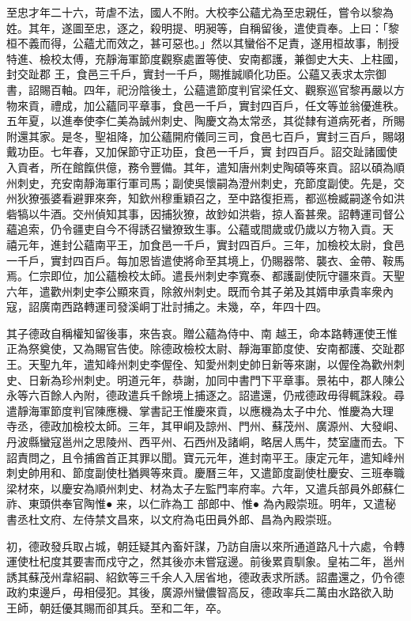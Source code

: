 \begin{pinyinscope}
 至忠才年二十六，苛虐不法，國人不附。大校李公蘊尤為至忠親任，嘗令以黎為姓。其年，遂圖至忠，逐之，殺明提、明昶等，自稱留後，遣使貢奉。上曰：「黎桓不義而得，公蘊尤而效之，甚可惡也。」然以其蠻俗不足責，遂用桓故事，制授特進、檢校太傅，充靜海軍節度觀察處置等使、安南都護，兼御史大夫、上柱國，封交趾郡
 王，食邑三千戶，實封一千戶，賜推誠順化功臣。公蘊又表求太宗御書，詔賜百軸。四年，祀汾陰後土，公蘊遣節度判官梁任文、觀察巡官黎再嚴以方物來貢，禮成，加公蘊同平章事，食邑一千戶，實封四百戶，任文等並翁優進秩。五年夏，以進奉使李仁美為誠州刺史、陶慶文為太常丞，其從隸有道病死者，所賜附還其家。是冬，聖祖降，加公蘊開府儀同三司，食邑七百戶，實封三百戶，賜翊戴功臣。七年春，又加保節守正功臣，食邑一千戶，實
 封四百戶。詔交趾諸國使入貢者，所在館餼供億，務令豐備。其年，遣知唐州刺史陶碩等來貢。詔以碩為順州刺史，充安南靜海軍行軍司馬；副使吳懷嗣為澄州刺史，充節度副使。先是，交州狄獠張婆看避罪來奔，知欽州穆重穎召之，至中路復拒焉，都巡檢臧嗣遂令如洪砦犒以牛酒。交州偵知其事，因捕狄獠，故鈔如洪砦，掠人畜甚衆。詔轉運司督公蘊追索，仍令疆吏自今不得誘召蠻獠致生事。公蘊或間歲或仍歲以方物入貢。天
 禧元年，進封公蘊南平王，加食邑一千戶，實封四百戶。三年，加檢校太尉，食邑一千戶，實封四百戶。每加恩皆遣使將命至其境上，仍賜器幣、襲衣、金帶、鞍馬焉。仁宗即位，加公蘊檢校太師。遣長州刺史李寬泰、都護副使阮守疆來貢。天聖六年，遣歡州刺史李公顯來貢，除敘州刺史。既而令其子弟及其婿申承貴率衆內寇，詔廣南西路轉運司發溪峒丁壯討捕之。未幾，卒，年四十四。


其子德政自稱權知留後事，來告哀。贈公蘊為侍中、南
 越王，命本路轉運使王惟正為祭奠使，又為賜官告使。除德政檢校太尉、靜海軍節度使、安南都護、交趾郡王。天聖九年，遣知峰州刺史李偓佺、知愛州刺史帥日新等來謝，以偓佺為歡州刺史、日新為珍州刺史。明道元年，恭謝，加同中書門下平章事。景祐中，郡人陳公永等六百餘人內附，德政遣兵千餘境上捕逐之。詔遣還，仍戒德政毋得輒誅殺。尋遣靜海軍節度判官陳應機、掌書記王惟慶來貢，以應機為太子中允、惟慶為大理
 寺丞，德政加檢校太師。三年，其甲峒及諒州、門州、蘇茂州、廣源州、大發峒、丹波縣蠻寇邕州之思陵州、西平州、石西州及諸峒，略居人馬牛，焚室廬而去。下詔責問之，且令捕酋首正其罪以聞。寶元元年，進封南平王。康定元年，遣知峰州刺史帥用和、節度副使杜猶興等來貢。慶曆三年，又遣節度副使杜慶安、三班奉職梁材來，以慶安為順州刺史、材為太子左監門率府率。六年，又遣兵部員外郎蘇仁祚、東頭供奉官陶惟●
 来，以仁祚為工
 部郎中、惟●
 為內殿崇班。明年，又遣秘書丞杜文府、左侍禁文昌來，以文府為屯田員外郎、昌為內殿崇班。



 初，德政發兵取占城，朝廷疑其內畜奸謀，乃訪自唐以來所通道路凡十六處，令轉運使杜杞度其要害而戍守之，然其後亦未嘗寇邊。前後累貢馴象。皇祐二年，邕州誘其蘇茂州韋紹嗣、紹欽等三千余人入居省地，德政表求所誘。詔盡還之，仍令德政約束邊戶，毋相侵犯。其後，廣源州蠻儂智高反，德政率兵二萬由水路欲入助
 王師，朝廷優其賜而卻其兵。至和二年，卒。




\end{pinyinscope}
